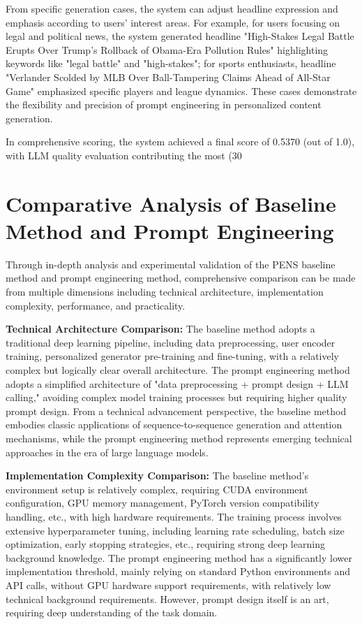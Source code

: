 \documentclass[10pt,a4paper]{article}
\begin{document}
From specific generation cases, the system can adjust headline expression and emphasis according to users' interest areas. For example, for users focusing on legal and political news, the system generated headline "High-Stakes Legal Battle Erupts Over Trump's Rollback of Obama-Era Pollution Rules" highlighting keywords like "legal battle" and "high-stakes"; for sports enthusiasts, headline "Verlander Scolded by MLB Over Ball-Tampering Claims Ahead of All-Star Game" emphasized specific players and league dynamics. These cases demonstrate the flexibility and precision of prompt engineering in personalized content generation.

In comprehensive scoring, the system achieved a final score of 0.5370 (out of 1.0), with LLM quality evaluation contributing the most (30%

\section{Comparative Analysis of Baseline Method and Prompt Engineering}
Through in-depth analysis and experimental validation of the PENS baseline method and prompt engineering method, comprehensive comparison can be made from multiple dimensions including technical architecture, implementation complexity, performance, and practicality.

\textbf{Technical Architecture Comparison:} The baseline method adopts a traditional deep learning pipeline, including data preprocessing, user encoder training, personalized generator pre-training and fine-tuning, with a relatively complex but logically clear overall architecture. The prompt engineering method adopts a simplified architecture of "data preprocessing + prompt design + LLM calling," avoiding complex model training processes but requiring higher quality prompt design. From a technical advancement perspective, the baseline method embodies classic applications of sequence-to-sequence generation and attention mechanisms, while the prompt engineering method represents emerging technical approaches in the era of large language models.

\textbf{Implementation Complexity Comparison:} The baseline method's environment setup is relatively complex, requiring CUDA environment configuration, GPU memory management, PyTorch version compatibility handling, etc., with high hardware requirements. The training process involves extensive hyperparameter tuning, including learning rate scheduling, batch size optimization, early stopping strategies, etc., requiring strong deep learning background knowledge. The prompt engineering method has a significantly lower implementation threshold, mainly relying on standard Python environments and API calls, without GPU hardware support requirements, with relatively low technical background requirements. However, prompt design itself is an art, requiring deep understanding of the task domain.
\end{document}
